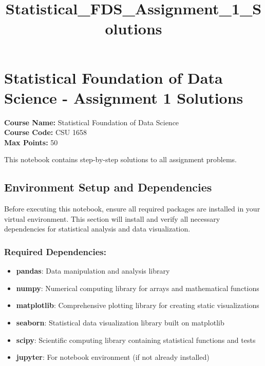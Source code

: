 \documentclass[11pt]{article}
\title{Statistical\_FDS\_Assignment\_1\_Solutions}
\providecommand{\tightlist}{%
      \setlength{\itemsep}{0pt}\setlength{\parskip}{0pt}}
\begin{document}
    
    \maketitle
    
    

    
    \section{Statistical Foundation of Data Science - Assignment 1
Solutions}\label{statistical-foundation-of-data-science---assignment-1-solutions}

\textbf{Course Name:} Statistical Foundation of Data Science\\
\textbf{Course Code:} CSU 1658\\
\textbf{Max Points:} 50

This notebook contains step-by-step solutions to all assignment
problems.

    \subsection{Environment Setup and
Dependencies}\label{environment-setup-and-dependencies}

Before executing this notebook, ensure all required packages are
installed in your virtual environment. This section will install and
verify all necessary dependencies for statistical analysis and data
visualization.

\subsubsection{Required Dependencies:}\label{required-dependencies}

\begin{itemize}
\tightlist
\item
  \textbf{pandas}: Data manipulation and analysis library
\item
  \textbf{numpy}: Numerical computing library for arrays and
  mathematical functions
\item
  \textbf{matplotlib}: Comprehensive plotting library for creating
  static visualizations
\item
  \textbf{seaborn}: Statistical data visualization library built on
  matplotlib
\item
  \textbf{scipy}: Scientific computing library containing statistical
  functions and tests
\item
  \textbf{jupyter}: For notebook environment (if not already installed)
\end{itemize}
\end{document}
